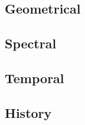 \subsection*{Geometrical}

\subsection*{Spectral}

\subsection*{Temporal}

\subsection*{History}












